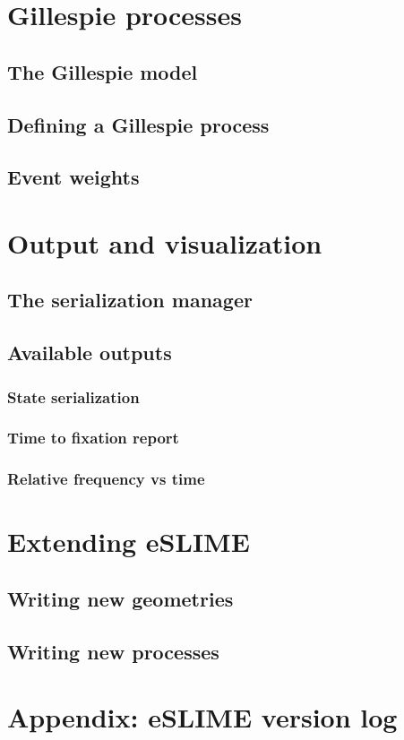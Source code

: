\documentclass[12pt]{scrartcl}
\begin{document}
\section{Gillespie processes}
\subsection{The Gillespie model}
\subsection{Defining a Gillespie process}
\subsection{Event weights}

\section{Output and visualization}
\subsection{The serialization manager}
\subsection{Available outputs}
\subsubsection{State serialization}
\subsubsection{Time to fixation report}
\subsubsection{Relative frequency vs time}

\section{Extending eSLIME}
\subsection{Writing new geometries}
\subsection{Writing new processes}

\section{Appendix: eSLIME version log}
\end{document}
